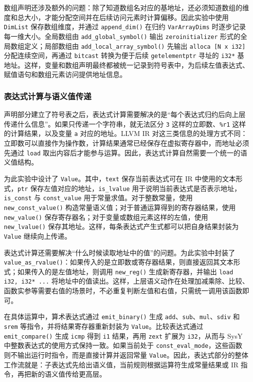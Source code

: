\documentclass[12pt]{ctexart}
\begin{document}
数组声明还涉及额外的问题：除了知道数组名对应的基地址，还必须知道数组的维度和总大小，才能分配空间并在后续访问元素时计算偏移。因此实验中使用 \texttt{DimList} 保存数组维度，并通过 \texttt{append\_dim()} 在归约 \texttt{VarArrayDims} 时逐步记录每一维大小。全局数组由 \texttt{add\_global\_symbol()} 输出 \texttt{zeroinitializer} 形式的全局数组定义；局部数组由 \texttt{add\_local\_array\_symbol()} 先输出 \texttt{alloca [N x i32]} 分配连续空间，再通过 \texttt{bitcast} 转换为便于后续 \texttt{getelementptr} 寻址的 \texttt{i32*} 基地址。这样，变量和数组声明最终都被统一记录到符号表中，为后续左值表达式、赋值语句和数组元素访问提供地址信息。

\subsubsection{表达式计算与语义值传递}

声明部分建立了符号表之后，表达式计算需要解决的是“每个表达式归约后向上层传递什么信息”。如果只传递一个字符串，就无法区分 \texttt{3} 这样的立即数、\texttt{\%r1} 这样的计算结果，以及变量 \texttt{a} 对应的地址。LLVM IR 对这三类信息的处理方式不同：立即数可以直接作为操作数，计算结果通常已经保存在虚拟寄存器中，而地址必须先通过 \texttt{load} 取出内容后才能参与运算。因此，表达式计算自然需要一个统一的语义值结构。

为此实验中设计了 \texttt{Value}。其中，\texttt{text} 保存当前表达式可在 IR 中使用的文本形式，\texttt{ptr} 保存左值对应的地址，\texttt{is\_lvalue} 用于说明当前表达式是否表示地址，\texttt{is\_const} 与 \texttt{const\_value} 用于常量求值。对于整数常量，使用 \texttt{new\_const\_value()} 构造常量语义值；对于普通运算得到的寄存器结果，使用 \texttt{new\_value()} 保存寄存器名；对于变量或数组元素这样的左值，使用 \texttt{new\_lvalue()} 保存其地址。这样，每条表达式产生式都可以把自身结果封装为 \texttt{Value} 继续向上传递。

表达式计算还需要解决“什么时候读取地址中的值”的问题。为此实验中封装了 \texttt{value\_as\_rvalue()}：如果传入的是立即数或寄存器结果，则直接返回其文本形式；如果传入的是左值地址，则调用 \texttt{new\_reg()} 生成新寄存器，并输出 \texttt{load i32, i32* ...} 将地址中的值读出。这样，上层语义动作在处理加减乘除、比较、函数实参等需要右值的场景时，不必重复判断左值和右值，只需统一调用该函数即可。

在具体运算中，算术表达式通过 \texttt{emit\_binary()} 生成 \texttt{add}、\texttt{sub}、\texttt{mul}、\texttt{sdiv} 和 \texttt{srem} 等指令，并将结果寄存器重新封装为 \texttt{Value}。比较表达式通过 \texttt{emit\_compare()} 生成 \texttt{icmp} 得到 \texttt{i1} 结果，再用 \texttt{zext} 扩展为 \texttt{i32}，从而与 SysY 中整数表达式的使用方式保持一致。如果当前处于 \texttt{const\_eval\_mode}，这些函数则不输出运行时指令，而是直接计算并返回常量 \texttt{Value}。因此，表达式部分的整体工作流就是：子表达式先给出语义值，当前规则根据运算符生成常量结果或 IR 指令，再把新的语义值传给更高层。
\end{document}
